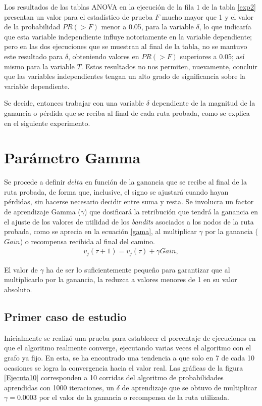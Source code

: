 Los resultados de las tablas ANOVA en la ejecución de la fila $1$ de la tabla \ref{exp2} presentan un valor para el estadístico de prueba $F$ mucho mayor que 1 y el valor de la probabilidad $PR(>F)$ menor a 0.05, para la variable $\delta$, lo que indicaría que esta variable independiente influye notoriamente en la variable dependiente; pero en las dos ejecuciones que se muestran al final de la tabla, no se mantuvo este resultado para $\delta$, obteniendo valores en $PR(>F)$ superiores a 0.05; así mismo para la variable $T$. Estos resultados no nos permiten, nuevamente, concluir que las variables independientes tengan un alto grado de significancia sobre la variable dependiente.

Se decide, entonces trabajar con una variable $\delta$ dependiente de la magnitud de la ganancia o pérdida que se reciba al final de cada ruta probada, como se explica en el siguiente experimento.

\section{Parámetro Gamma}

Se procede a definir $delta$ en función de la ganancia que se recibe al final de la ruta probada, de forma que, inclusive, el signo se ajustará cuando hayan pérdidas, sin hacerse necesario decidir entre suma y resta. Se involucra un factor de aprendizaje Gamma ($\gamma$) que dosificará la retribución que tendrá la ganancia en el ajuste de los valores de utilidad de los \textit{bandits} asociados a los nodos de la ruta probada, como se aprecia en la ecuación \ref{gama}, al multiplicar $\gamma$ por la ganancia ($Gain$) o recompensa recibida al final del camino.
\begin{eqnarray}
\label{gama}
v_j(\tau + 1) = v_j(\tau) + \gamma Gain,
\end{eqnarray}

El valor de $\gamma$ ha de ser lo suficientemente pequeño para garantizar que al multiplicarlo por la ganancia, la reduzca a valores menores de 1 en su valor absoluto.

\subsection{Primer caso de estudio}

Inicialmente se realizó una prueba para establecer el porcentaje de ejecuciones en que el algoritmo realmente converge, ejecutando varias veces el algoritmo con el grafo ya fijo. En esta, se ha encontrado una tendencia a que solo en 7 de cada 10 ocasiones se logra la convergencia hacia el valor real. Las gráficas de la figura \ref{Ejecuta10} corresponden a 10 corridas del algoritmo de probabilidades aprendidas con 1000 iteraciones, un $\delta$ de aprendizaje que se obtuvo de multiplicar $\gamma = 0.0003$ por el valor de la ganancia o recompensa de la ruta utilizada.

